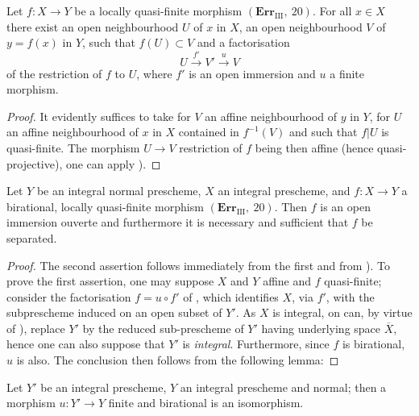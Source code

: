 
\begin{corollary}[8.12.9]
\label{IV.8.12.9}
Let $f:X\to Y$ be a locally quasi-finite morphism $(\mathbf{Err}_{\text{III}},~20)$.
For all $x\in X$ there exist an open neighbourhood $U$ of $x$ in $X$, an open neighbourhood $V$ of $y=f(x)$ in $Y$, such that $f(U)\subset V$ and a factorisation
\[
U\xrightarrow{f'}V'\xrightarrow{u}V
\]
of the restriction of $f$ to $U$, where $f'$ is an open immersion and $u$ a finite morphism.
\end{corollary}

\begin{proof}
It evidently suffices to take for $V$ an affine neighbourhood of $y$ in $Y$, for $U$ an affine neighbourhood of $x$ in $X$ contained in $f^{-1}(V)$ and such that $f|U$ is quasi-finite.
The morphism $U\to V$ restriction of $f$ being then affine (hence quasi-projective), one can apply ).
\end{proof}

\begin{corollary}[8.12.10]
\label{IV.8.12.10}
Let $Y$ be an integral normal prescheme, $X$ an integral prescheme, and $f:X\to Y$ a birational, locally quasi-finite morphism $(\mathbf{Err}_{\text{III}},~20)$.
Then $f$ is an open immersion ouverte and furthermore it is necessary and sufficient that $f$ be separated.
\end{corollary}

\begin{proof}
The second assertion follows immediately from the first and from ).
To prove the first assertion, one may suppose $X$ and $Y$ affine and $f$ quasi-finite; consider the factorisation $f=u\circ f'$ of , which identifies $X$, via $f'$, with the subprescheme induced on an open subset of $Y'$.
As $X$ is integral, on can, by virtue of ), replace $Y'$ by the reduced sub-prescheme of $Y'$ having underlying space $\overline{X}$, hence one can also suppose that $Y'$ is \emph{integral}.
Furthermore, since $f$ is birational, $u$ is also.
The conclusion then follows from the following lemma:
\end{proof}

\begin{lemma}[8.12.10.1]
\label{IV.8.12.10.1}
Let $Y'$ be an integral prescheme, $Y$ an integral prescheme and normal; then a morphism $u:Y'\to Y$ finite and birational is an isomorphism.
\end{lemma}

